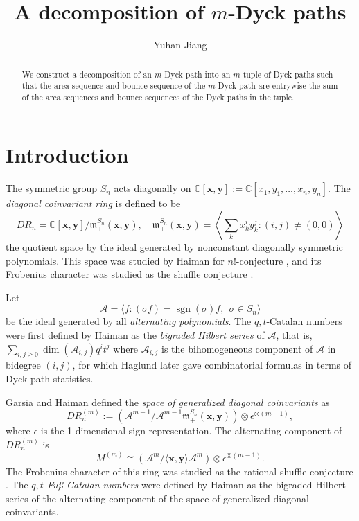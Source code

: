 \documentclass[12pt,reqno]{amsart}
\theoremstyle{definition}
\newcommand{\C}{\mathbb C}
\newcommand{\x}{\mathbf x}
\newcommand{\y}{\mathbf y}
\DeclareMathOperator{\sgn}{sgn}
\begin{document}
\title{A decomposition of $m$-Dyck paths}
\author{Yuhan Jiang}
\address{Department of Mathematics,
University of California, Berkeley, CA, USA}


\begin{abstract}
We construct a decomposition of an $m$-Dyck path into an $m$-tuple of Dyck paths such that the area sequence and bounce sequence of the $m$-Dyck path are entrywise the sum of the area sequences and bounce sequences of the Dyck paths in the tuple.
\end{abstract}

\maketitle

\section{Introduction}
The symmetric group $S_n$ acts diagonally on 
$\C[\mathbf{x},\mathbf{y}] := \C[x_1,y_1,\dots,x_n,y_n]$.
The \emph{diagonal coinvariant ring} is defined to be 
\[
  DR_n = \C[\x,\y]/\mathfrak{m}_+^{S_n}(\x,\y), \quad \mathfrak{m}_+^{S_n}(\x,\y) = \left\langle \sum_k x_k^i y_k^j: (i,j) \neq (0,0) \right \rangle
\]
the quotient space by the ideal generated by nonconstant diagonally symmetric polynomials. 
This space was studied by Haiman \cite{Haiman} for $n!$-conjecture \cite{hilbertscheme}, and its Frobenius character was studied as the shuffle conjecture \cite{10.1215/S0012-7094-04-12621-1,MR3787405}.

Let 
\[
  \mathcal{A} = \langle f: (\sigma f) = \sgn(\sigma) f, ~~\sigma \in S_n \rangle
\]
be the ideal generated by all \emph{alternating polynomials}. 
The $q,t$-Catalan numbers were first defined by Haiman as the \emph{bigraded Hilbert series} of $\mathcal{A}$, that is, $\sum_{i,j \geq 0} \dim(\mathcal{A}_{i,j}) q^i t^j$ where $\mathcal{A}_{i,j}$ is the bihomogeneous component of $\mathcal{A}$ in bidegree $(i,j)$, for which Haglund \cite{MR1972636} later gave combinatorial formulas in terms of Dyck path statistics.

Garsia and Haiman \cite{garsiahaiman} defined the \emph{space of generalized diagonal coinvariants} as
\[
  DR_n^{(m)} := (\mathcal{A}^{m-1}/\mathcal{A}^{m-1}\mathfrak{m}_+^{S_n}(\x,\y)) \otimes \epsilon^{\otimes (m-1)},
\]
where $\epsilon$ is the 1-dimensional sign representation.
The alternating component of $DR_n^{(m)}$ is
\[
  M^{(m)} \cong \left( \mathcal{A}^m/\langle \mathbf{x},\mathbf{y} \rangle \mathcal{A}^m \right) \otimes \epsilon^{\otimes (m-1)}.
\]
The Frobenius character of this ring was studied as the rational shuffle conjecture \cite{MR2971696,MR3239135,MR3383172,MR3556418,10.1215/S0012-7094-04-12621-1}.
The \emph{$q,t$-Fu\ss-Catalan numbers} were defined by Haiman \cite{Haiman} as the bigraded Hilbert series of the alternating component of the space of generalized diagonal coinvariants.
\end{document}

